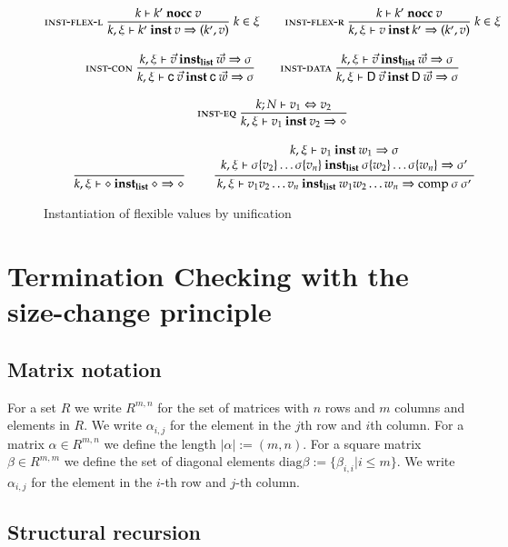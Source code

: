 \begin{figure}[p]
\begin{gather*}
\mbox{\sc inst-flex-l}\ \dfrac{k\vdash k'\mbox{ \textbf{nocc} }v}{k,\xi\vdash k'\:\mathbf{inst}\:v\Rightarrow (k',v)}
{\; k \in \xi }
\qquad
\mbox{\sc inst-flex-r}\ \dfrac{k\vdash k'\mbox{ \textbf{nocc} }v}{k,\xi\vdash v\:\mathbf{inst}\:k'\Rightarrow (k',v)}
{\; k \in \xi}
\\[2ex]
\mbox{\sc inst-con}\ \dfrac{{k,\xi\vdash\vec{v}\:\mathbf{inst_{list}}\:\vec{w}\Rightarrow \sigma}}{k,\xi\vdash\mathsf{c} \: \vec{v}\:\mathbf{inst}\:\mathsf{c} \: \vec{w}\Rightarrow \sigma
}
\qquad
\mbox{\sc inst-data}\ \dfrac{{k,\xi\vdash\vec{v}\:\mathbf{inst_{list}}\:\vec{w}\Rightarrow \sigma}}{k,\xi\vdash\mathsf{D} \: \vec{v}\:\mathbf{inst}\:\mathsf{D} \: \vec{w}\Rightarrow \sigma
}
\\[2ex]
\mbox{\sc inst-eq}\ \dfrac{k;N\vdash v_1\Leftrightarrow v_2}{k,\xi\vdash v_1\:\mathbf{inst}\:v_2\Rightarrow \diamond
}
\\[2ex]
\ \dfrac{}{k,\xi\vdash\diamond\:\mathbf{inst_{list}}\:\diamond\Rightarrow \diamond}
\qquad
\ \dfrac{\begin{array}[b]{c}k,\xi\vdash v_1\:\mathbf{inst}\:w_1\Rightarrow \sigma\\k,\xi\vdash\sigma\{v_2\} \ldots \sigma\{v_n\}\:\mathbf{inst_{list}}\:\sigma\{w_2\} \ldots \sigma\{w_n\}\Rightarrow \sigma'\end{array}}{k,\xi\vdash v_1 v_2 \ldots v_n\:\mathbf{inst_{list}}\:w_1 w_2 \ldots w_n\Rightarrow \mathrm{comp}\:\sigma\:\sigma'}
\end{gather*}
\caption{Instantiation of flexible values by unification}
\end{figure}

\chapter{Termination Checking with the size-change principle}

\section{Matrix notation}

\newcommand{\diag}{\mathrm{diag}}

For a set $R$ we write $R^{m,n}$ for the set of matrices with $n$ rows and $m$ columns and elements in $R$.
We write $\alpha_{i,j}$ for the element in the $j$th row and $i$th column.
For a matrix $\alpha \in R^{m,n}$ we define the length $|\alpha| := (m,n)$.
For a square matrix $\beta \in R^{m,m}$ we define the set of diagonal elements $\diag \beta := \{ \beta_{i,i} \vert i \leq m\}$.
We write $\alpha_{i,j}$ for the element in the $i$-th row and $j$-th column.


\newcommand{\order}{\mathrm{Order}}
\section{Structural recursion}

